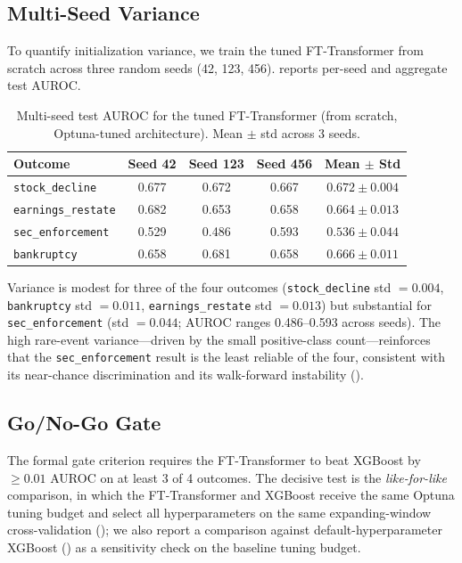 \subsection{Multi-Seed Variance}
\label{sec:results_multiseed}

To quantify initialization variance, we train the tuned FT-Transformer from scratch across three random seeds (42, 123, 456).  reports per-seed and aggregate test AUROC.

\begin{table}[ht]
  \centering
  \caption{Multi-seed test AUROC for the tuned FT-Transformer (from scratch, Optuna-tuned architecture). Mean $\pm$ std across 3 seeds.}
  \label{tab:multiseed}
  \small
  \begin{tabular}{@{}lcccc@{}}
    \toprule
    Outcome & Seed 42 & Seed 123 & Seed 456 & Mean $\pm$ Std \\
    \midrule
    \texttt{stock\_decline} & 0.677 & 0.672 & 0.667 & $0.672 \pm 0.004$ \\
    \texttt{earnings\_restate} & 0.682 & 0.653 & 0.658 & $0.664 \pm 0.013$ \\
    \texttt{sec\_enforcement} & 0.529 & 0.486 & 0.593 & $0.536 \pm 0.044$ \\
    \texttt{bankruptcy} & 0.658 & 0.681 & 0.658 & $0.666 \pm 0.011$ \\
    \bottomrule
  \end{tabular}
\end{table}

Variance is modest for three of the four outcomes (\texttt{stock\_decline} std $= 0.004$, \texttt{bankruptcy} std $= 0.011$, \texttt{earnings\_restate} std $= 0.013$) but substantial for \texttt{sec\_enforcement} (std $= 0.044$; AUROC ranges 0.486--0.593 across seeds). The high rare-event variance---driven by the small positive-class count---reinforces that the \texttt{sec\_enforcement} result is the least reliable of the four, consistent with its near-chance discrimination and its walk-forward instability ().

\subsection{Go/No-Go Gate}
\label{sec:results_gate}

The formal gate criterion requires the FT-Transformer to beat XGBoost by $\geq 0.01$ AUROC on at least 3 of 4 outcomes. The decisive test is the \emph{like-for-like} comparison, in which the FT-Transformer and XGBoost receive the same Optuna tuning budget and select all hyperparameters on the same expanding-window cross-validation (); we also report a comparison against default-hyperparameter XGBoost () as a sensitivity check on the baseline tuning budget.

